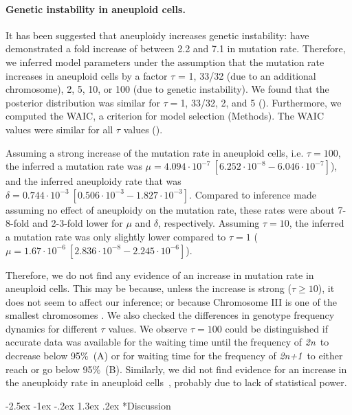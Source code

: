 \documentclass[12pt]{extarticle}
\makeatletter
\renewcommand\section{\@startsection {section}{1}{\z@}%
     {-2.5ex \@plus -1ex \@minus -.2ex}%
     {1.3ex \@plus.2ex}%
    {\Large\bfseries}}
\newcommand{\euwt}{\emph{2n}}
\newcommand{\anwt}{\emph{2n+1}}
\makeatother
\begin{document}
\paragraph{Genetic instability in aneuploid cells.}
It has been suggested that aneuploidy increases genetic instability: \citet{Sheltzer2011b} have demonstrated a fold increase of between 2.2 and 7.1 in mutation rate.
Therefore, we inferred model parameters under the assumption that the mutation rate increases in aneuploid cells by a factor $\tau$ = 1, 33/32 (due to an additional chromosome), 2, 5, 10, or 100 (due to genetic instability).
We found that the posterior distribution was similar for $\tau=$1, 33/32, 2, and 5 (). Furthermore, we computed the WAIC, a criterion for model selection (Methods). The WAIC values were similar for all $\tau$ values ().

Assuming a strong increase of the mutation rate in aneuploid cells, i.e. $\tau=100$, the inferred a mutation rate was $\mu=4.094\cdot10^{-7}\ [6.252\cdot10^{-8}-6.046\cdot10^{-7}]$), and the inferred aneuploidy rate that was  $\delta=0.744\cdot10^{-3}\ [0.506\cdot10^{-3}-1.827\cdot10^{-3}]$. 
Compared to inference made assuming no effect of aneuploidy on the mutation rate, these rates were about 7-8-fold and 2-3-fold lower for $\mu$ and $\delta$, respectively.
Assuming $\tau=10$, the inferred a mutation rate was only slightly lower compared to $\tau=1$ ($\mu=1.67\cdot10^{-6}\ [2.836\cdot10^{-8}-2.245\cdot10^{-6}]$). 

Therefore, we do not find any evidence of an increase in mutation rate in aneuploid cells. This may be because, unless the increase is strong ($\tau \ge 10$), it does not seem to affect our inference; or because Chromosome III is one of the smallest chromosomes \citep{Gilchrist2019}.
We also checked the differences in genotype frequency dynamics for different $\tau$ values. We observe $\tau=100$ could be distinguished if accurate data was available for the waiting time until the frequency of \euwt\ to decrease below 95\%~(A) or for waiting time for the frequency of \anwt\ to either reach or go below 95\%~(B).
Similarly, we did not find evidence for an increase in the aneuploidy rate in aneuploid cells~\citep{Sheltzer2011b}, probably due to lack of statistical power.


\section*{Discussion}
\end{document}
